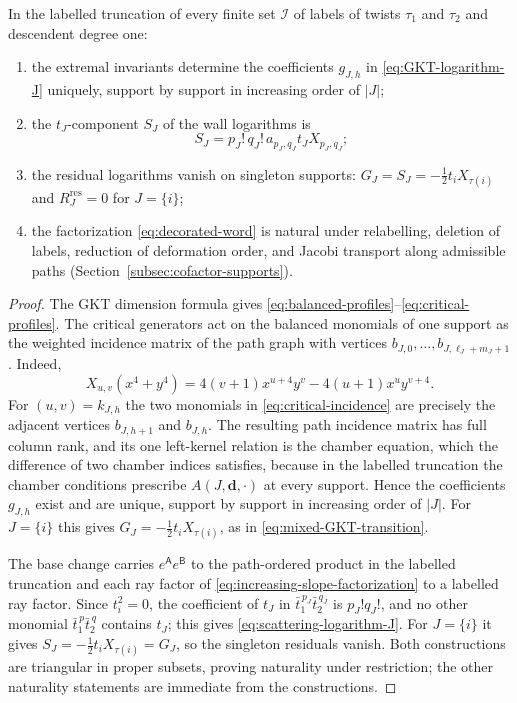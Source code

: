 \begin{proposition}
\label{thm:all-order-decoration}
In the labelled truncation of every finite set $\mathcal I$ of labels of
twists $\tau_1$ and $\tau_2$ and descendent degree one:
\begin{enumerate}
\item the extremal invariants determine the coefficients $g_{J,h}$ in
\eqref{eq:GKT-logarithm-J} uniquely, support by support in increasing order
of $|J|$;
\item the $t_J$-component $S_J$ of the wall logarithms is
\begin{equation}\label{eq:scattering-logarithm-J}
 S_J=p_J!\,q_J!\,a_{p_J,q_J}t_JX_{p_J,q_J};
\end{equation}
\item the residual logarithms vanish on singleton supports:
$G_J=S_J=-\frac12t_iX_{\tau(i)}$ and $R^{\mathrm{res}}_J=0$ for $J=\{i\}$;
\item the factorization \eqref{eq:decorated-word} is natural under
relabelling, deletion of labels, reduction of deformation order, and Jacobi
transport along admissible paths (Section~\ref{subsec:cofactor-supports}).
\end{enumerate}
\end{proposition}

\begin{proof}
The GKT dimension formula gives
\eqref{eq:balanced-profiles}--\eqref{eq:critical-profiles}.  The critical
generators act on the balanced monomials of one support as the weighted
incidence matrix of the path graph with vertices
$b_{J,0},\dots,b_{J,\ell_J+m_J+1}$.  Indeed,
\begin{equation}\label{eq:critical-incidence}
 X_{u,v}(x^4+y^4)
 =4(v+1)x^{u+4}y^v-4(u+1)x^uy^{v+4}.
\end{equation}
For $(u,v)=k_{J,h}$ the two monomials in
\eqref{eq:critical-incidence} are precisely the adjacent vertices
$b_{J,h+1}$ and $b_{J,h}$.  The resulting path incidence matrix has full
column rank, and its one left-kernel relation is the chamber equation, which
the difference of two chamber indices satisfies, because in the labelled
truncation the chamber conditions \cite[Def.~3.47]{grossetal2022open}
prescribe $A(J,\mathbf d,\cdot)$ at every support.  Hence the coefficients
$g_{J,h}$ exist and are unique, support by support in increasing order of
$|J|$.  For $J=\{i\}$ this gives $G_J=-\frac12t_iX_{\tau(i)}$, as in
\eqref{eq:mixed-GKT-transition}.

The base change carries $e^{\mathsf A}e^{\mathsf B}$ to the path-ordered
product in the labelled truncation and each ray factor of
\eqref{eq:increasing-slope-factorization} to a labelled ray factor.  Since
$t_i^2=0$, the coefficient of $t_J$ in $\bar t_1^{\,p_J}\bar t_2^{\,q_J}$ is
$p_J!q_J!$, and no other monomial $\bar t_1^{\,p}\bar t_2^{\,q}$ contains $t_J$; this
gives \eqref{eq:scattering-logarithm-J}.  For $J=\{i\}$ it gives
$S_J=-\frac12t_iX_{\tau(i)}=G_J$, so the singleton residuals vanish.  Both
constructions are triangular in proper subsets, proving naturality under
restriction; the other naturality statements are immediate from the
constructions.
\end{proof}


